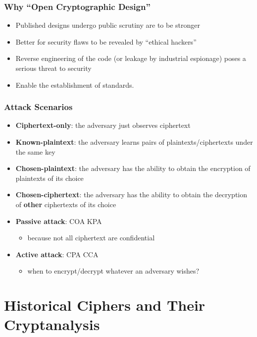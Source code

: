 \begin{frame}\frametitle{Why ``Open Cryptographic Design''}
\begin{itemize}
\item Published designs undergo public scrutiny are to be stronger
\item Better for security flaws to be revealed by ``ethical hackers''
\item Reverse engineering of the code (or leakage by industrial espionage) poses a serious threat to security
\item Enable the establishment of standards.
\end{itemize}
\end{frame}
\begin{frame}\frametitle{Attack Scenarios}	
\begin{itemize}
\item \textbf{Ciphertext-only}: the adversary just observes ciphertext
\item \textbf{Known-plaintext}: the adversary learns pairs of plaintexts/ciphertexts under the same key
\item \textbf{Chosen-plaintext}: the adversary has the ability to obtain the encryption of plaintexts of its choice
\item \textbf{Chosen-ciphertext}: the adversary has the ability to obtain the decryption of \textbf{other} ciphertexts of its choice
\item \textbf{Passive attack}: COA KPA
\begin{itemize}
\item because not all ciphertext are confidential
\end{itemize}
\item \textbf{Active attack}: CPA CCA
\begin{itemize}
\item when to encrypt/decrypt whatever an adversary wishes?
\end{itemize}
\end{itemize}	
\end{frame}
\section{Historical Ciphers and Their Cryptanalysis}


